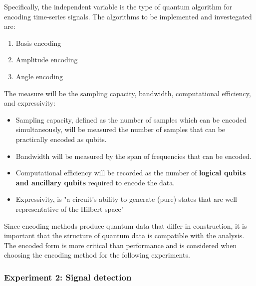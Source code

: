 Specifically, the independent variable is the type of quantum algorithm for encoding time-series signals.
The algorithms to be implemented and investegated are:
\begin{enumerate}
    \item Basis encoding
    \item Amplitude encoding
    \item Angle encoding
\end{enumerate}

The measure will be the sampling capacity, bandwidth, computational efficiency, and expressivity:
\begin{itemize}
    \item Sampling capacity, defined as the number of samples which can be encoded simultaneously, will be measured the number of samples that can be practically encoded as qubits.
    \item Bandwidth will be measured by the span of frequencies that can be encoded.
    \item Computational efficiency will be recorded as the number of \textbf{logical qubits and ancillary qubits} required to encode the data.
    \item Expressivity, is "a circuit’s ability to generate (pure) states that are well representative of the Hilbert space" \cite{sim_expressibility_2019} 
\end{itemize}
Since encoding methods produce quantum data that differ in construction, it is important that the structure of quantum data is compatible with the analysis.
The encoded form is more critical than performance and is considered when choosing the encoding method for the following experiments.


\subsubsection{Experiment 2: Signal detection}

